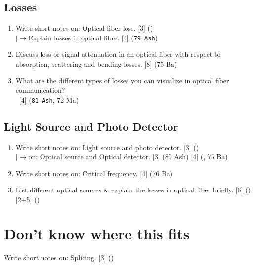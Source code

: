 \documentclass[12pt]{article}
\newcommand{\lb}{\\$\left|\rightarrow\right.$}
\newcommand{\enter}{\\\textcolor{white}{1}}
\begin{document}
  \subsection{Losses}
    \begin{enumerate}
      \item Write short notes on: Optical fiber loss. \hfill [3] ()
        \lb Explain losses in optical fibre. \hfill [4] (\texttt{79 Ash})
      
      \item Discuss loss or signal attenuation in an optical fiber with respect to absorption, scattering and bending losses. \hfill [8] (75 Ba)

      \item What are the different types of losses you can visualize in optical fiber communication?
        \enter\hfill [4] (\texttt{81 Ash}, 72 Ma)
    \end{enumerate}

  \subsection{Light Source and Photo Detector}
    \begin{enumerate}
      \item Write short notes on: Light source and photo detector. \hfill [3] ()
        \lb on: Optical source and Optical detector. \hfill [3] (80 Ash) [4] (, 75 Ba)

      \item Write short notes on: Critical frequency. \hfill [4] (76 Ba)

      \item List different optical sources \& explain the losses in optical fiber briefly. \hfill [6] () [2+5] ()
    \end{enumerate}

\section{Don't know where this fits}
 Write short notes on: Splicing. \hfill [3] ()
\end{document}
